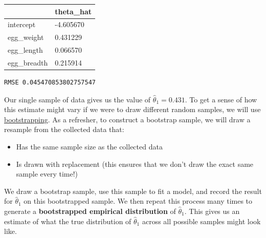 \documentclass[
  letterpaper,
  DIV=11,
  numbers=noendperiod]{scrreprt}
\providecommand{\tightlist}{%
  \setlength{\itemsep}{0pt}\setlength{\parskip}{0pt}}\usepackage{longtable,booktabs,array}
\begin{document}
\begin{longtable}[]{@{}ll@{}}
\toprule\noalign{}
& theta\_hat \\
\midrule\noalign{}
\endhead
\bottomrule\noalign{}
\endlastfoot
intercept & -4.605670 \\
egg\_weight & 0.431229 \\
egg\_length & 0.066570 \\
egg\_breadth & 0.215914 \\
\end{longtable}

\begin{verbatim}
RMSE 0.045470853802757547
\end{verbatim}

Our single sample of data gives us the value of
\(\hat{\theta}_1=0.431\). To get a sense of how this estimate might vary
if we were to draw different random samples, we will use
\href{https://inferentialthinking.com/chapters/13/2/Bootstrap.html?}{bootstrapping}.
As a refresher, to construct a bootstrap sample, we will draw a resample
from the collected data that:

\begin{itemize}
\tightlist
\item
  Has the same sample size as the collected data
\item
  Is drawn with replacement (this ensures that we don't draw the exact
  same sample every time!)
\end{itemize}

We draw a bootstrap sample, use this sample to fit a model, and record
the result for \(\hat{\theta}_1\) on this bootstrapped sample. We then
repeat this process many times to generate a \textbf{bootstrapped
empirical distribution} of \(\hat{\theta}_1\). This gives us an estimate
of what the true distribution of \(\hat{\theta}_1\) across all possible
samples might look like.
\end{document}
